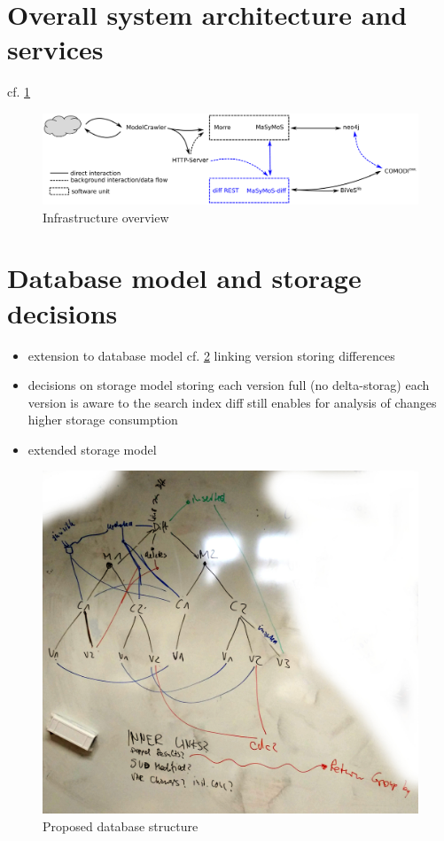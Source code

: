 \section{Overall system architecture and services}
cf. \ref{fig:system-overview}
\begin{figure}
	\includegraphics[width=\textwidth]{resources/system-overview.pdf}
	\caption{Infrastructure overview }
	\label{fig:system-overview}
\end{figure}

\section{Database model and storage decisions}
\begin{itemize}
\item extension to database model cf. \ref{fig:db-model}
	\subitem linking version
	\subitem storing differences
\item decisions on storage model
	\subitem storing each version full (no delta-storag)
	\subitem each version is aware to the search index
	\subitem diff still enables for analysis of changes
	\subitem higher storage consumption
\item extended storage model
\end{itemize}
\begin{figure}
	\includegraphics[width=\textwidth]{resources/db_structure.jpg}
	\caption{Proposed database structure}
	\label{fig:db-model}
\end{figure}